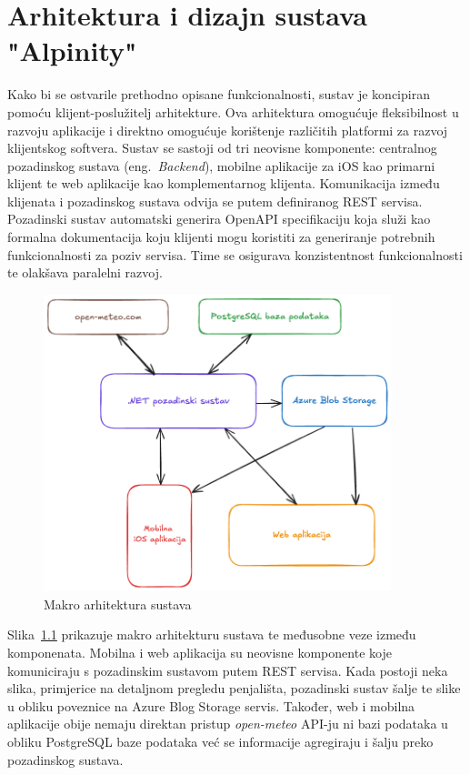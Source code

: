 \chapter{Arhitektura i dizajn sustava "Alpinity"}

Kako bi se ostvarile prethodno opisane funkcionalnosti, sustav je koncipiran pomoću klijent-poslužitelj arhitekture. Ova arhitektura omogućuje fleksibilnost u razvoju aplikacije i direktno omogućuje korištenje različitih platformi za razvoj klijentskog softvera. Sustav se sastoji od tri neovisne komponente: centralnog pozadinskog sustava (eng. \textit{Backend}), mobilne aplikacije za iOS kao primarni klijent te web aplikacije kao komplementarnog klijenta. 
Komunikacija između klijenata i pozadinskog sustava odvija se putem definiranog REST servisa. Pozadinski sustav automatski generira OpenAPI specifikaciju koja služi kao formalna dokumentacija koju klijenti mogu koristiti za generiranje potrebnih funkcionalnosti za poziv servisa. Time se osigurava konzistentnost funkcionalnosti te olakšava paralelni razvoj.

\begin{figure}[H]
    \centering
    \includegraphics[width=0.9\textwidth]{images/arhitektura/general_arch.png}
    \caption{Makro arhitektura sustava}
    \label{fig:arhitektura}
\end{figure}

Slika~\ref{fig:arhitektura} prikazuje makro arhitekturu sustava te međusobne veze između komponenata. Mobilna i web aplikacija su neovisne komponente koje komuniciraju s pozadinskim sustavom putem REST servisa. Kada postoji neka slika, primjerice na detaljnom pregledu penjališta, pozadinski sustav šalje te slike u obliku poveznice na Azure Blog Storage servis. Također, web i mobilna aplikacije obije nemaju direktan pristup \textit{open-meteo} API-ju ni bazi podataka u obliku PostgreSQL baze podataka već se informacije agregiraju i šalju preko pozadinskog sustava.

